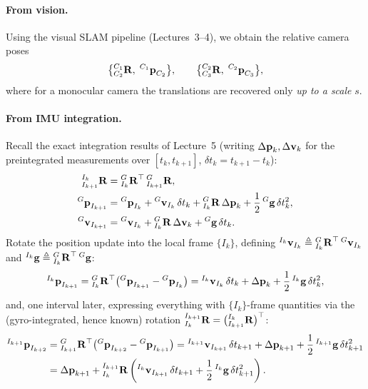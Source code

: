 \paragraph{From vision.} Using the visual SLAM pipeline (Lectures~3--4), we obtain the relative camera poses
\begin{align}
\big\{ {}^{C_1}_{C_2}\boldsymbol{\mathbf{R}},\; {}^{C_1}\boldsymbol{\mathbf{p}}_{C_2} \big\},
\qquad
\big\{ {}^{C_2}_{C_3}\boldsymbol{\mathbf{R}},\; {}^{C_2}\boldsymbol{\mathbf{p}}_{C_3} \big\},
\end{align}
where for a monocular camera the translations are recovered only \emph{up to a scale} $s$.

\paragraph{From IMU integration.} Recall the exact integration results of Lecture~5 (writing $\Delta\boldsymbol{\mathbf{p}}_k, \Delta\boldsymbol{\mathbf{v}}_k$ for the preintegrated measurements over $[t_k, t_{k+1}]$, $\delta t_k = t_{k+1} - t_k$):
\begin{align}
{}^{I_k}_{I_{k+1}}\boldsymbol{\mathbf{R}} &= {}^{G}_{I_k}\boldsymbol{\mathbf{R}}^\top\,{}^{G}_{I_{k+1}}\boldsymbol{\mathbf{R}}, \\
{}^{G}\boldsymbol{\mathbf{p}}_{I_{k+1}} &= {}^{G}\boldsymbol{\mathbf{p}}_{I_k} + {}^{G}\boldsymbol{\mathbf{v}}_{I_k}\,\delta t_k + {}^{G}_{I_k}\boldsymbol{\mathbf{R}}\,\Delta\boldsymbol{\mathbf{p}}_k + \frac{1}{2}\,{}^{G}\boldsymbol{\mathbf{g}}\,\delta t_k^2, \\
{}^{G}\boldsymbol{\mathbf{v}}_{I_{k+1}} &= {}^{G}\boldsymbol{\mathbf{v}}_{I_k} + {}^{G}_{I_k}\boldsymbol{\mathbf{R}}\,\Delta\boldsymbol{\mathbf{v}}_k + {}^{G}\boldsymbol{\mathbf{g}}\,\delta t_k.
\end{align}
Rotate the position update into the local frame $\{I_k\}$, defining ${}^{I_k}\boldsymbol{\mathbf{v}}_{I_k} \triangleq {}^{G}_{I_k}\boldsymbol{\mathbf{R}}^\top\,{}^{G}\boldsymbol{\mathbf{v}}_{I_k}$ and ${}^{I_k}\boldsymbol{\mathbf{g}} \triangleq {}^{G}_{I_k}\boldsymbol{\mathbf{R}}^\top\,{}^{G}\boldsymbol{\mathbf{g}}$:
\begin{align}
{}^{I_k}\boldsymbol{\mathbf{p}}_{I_{k+1}}
= {}^{G}_{I_k}\boldsymbol{\mathbf{R}}^\top\big({}^{G}\boldsymbol{\mathbf{p}}_{I_{k+1}} - {}^{G}\boldsymbol{\mathbf{p}}_{I_k}\big)
= {}^{I_k}\boldsymbol{\mathbf{v}}_{I_k}\,\delta t_k + \Delta\boldsymbol{\mathbf{p}}_k + \frac{1}{2}\,{}^{I_k}\boldsymbol{\mathbf{g}}\,\delta t_k^2,
\label{eq:lec06-localpos1}
\end{align}
and, one interval later, expressing everything with $\{I_k\}$-frame quantities via the (gyro-integrated, hence known) rotation ${}^{I_{k+1}}_{I_k}\boldsymbol{\mathbf{R}} = \big({}^{I_k}_{I_{k+1}}\boldsymbol{\mathbf{R}}\big)^\top$:
\begin{align}
{}^{I_{k+1}}\boldsymbol{\mathbf{p}}_{I_{k+2}}
&= {}^{G}_{I_{k+1}}\boldsymbol{\mathbf{R}}^\top\big({}^{G}\boldsymbol{\mathbf{p}}_{I_{k+2}} - {}^{G}\boldsymbol{\mathbf{p}}_{I_{k+1}}\big)
= {}^{I_{k+1}}\boldsymbol{\mathbf{v}}_{I_{k+1}}\,\delta t_{k+1} + \Delta\boldsymbol{\mathbf{p}}_{k+1} + \frac{1}{2}\,{}^{I_{k+1}}\boldsymbol{\mathbf{g}}\,\delta t_{k+1}^2 \\
&= \Delta\boldsymbol{\mathbf{p}}_{k+1} + {}^{I_{k+1}}_{I_k}\boldsymbol{\mathbf{R}}\left({}^{I_k}\boldsymbol{\mathbf{v}}_{I_{k+1}}\,\delta t_{k+1} + \frac{1}{2}\,{}^{I_k}\boldsymbol{\mathbf{g}}\,\delta t_{k+1}^2\right).
\label{eq:lec06-localpos2}
\end{align}

